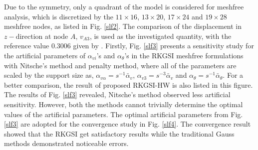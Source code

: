 Due to the symmetry, only a quadrant of the model is considered for meshfree analysis, which is discretized by the $11\times 16$, $13\times 20$, $17\times 24$ and $19\times28$ meshfree nodes, as listed in Fig. \ref{slf2}. The comparison of the displacement in $z-$direction at node $A$, $v_{A3}$, is used as the investigated quantity, with the reference value 0.3006 given by \cite{kiendl2009}. Firstly, Fig. \ref{slf3} presents a sensitivity study for the artificial parameters of $\alpha_{vi}$'s and $\alpha_\theta$'s in the RKGSI meshfree formulations with Nitsche's method and penalty method, where all of the parameters are scaled by the support size as, $\alpha_{v\alpha} = s^{-1}\bar \alpha_v$, $\alpha_{v3} = s^{-3} \bar \alpha_v$ and $\alpha_\theta = s^{-1}\bar \alpha_\theta$. For a better comparison, the result of proposed RKGSI-HW is also listed in this figure. The results of Fig. \ref{slf3} revealed, Nitsche's method observed less artificial sensitivity. However, both the methods cannot trivially determine the optimal values of the artificial parameters. The optimal artificial parameters from Fig. \ref{slf3} are adopted for the convergence study in Fig. \ref{slf4}. The convergence result showed that the RKGSI get satisfactory results while the traditional Gauss methods demonstrated noticeable errors.

